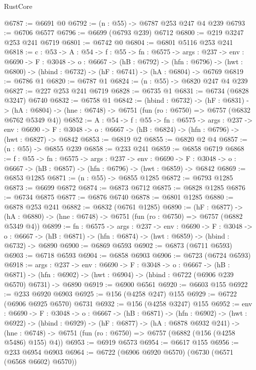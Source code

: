 \begin{lexlean}{RustCore}
\begin{coremodule}
@6787 := @6691 @0
@6792 := (n : @55) -> @6787 @253 @247 @4 @239
@6793 := @6706 @6577
@6796 := @6699 (@6793 @239) @6712
@6800 := @219 @3247 @253 @241 @6719
@6801 := @6742 @0
@6804 := @6801 @5116 @253 @241
@6818 := {c : @53} ->
  {A : @54} ->
  {f : @55} ->
  {fn : @6575} ->
  {args : @237} ->
  {env : @6690} ->
  {F : @3048} ->
  {o : @6667} ->
  (hB : @6792) ->
  (hfn : @6796) -> (hwt : @6800) -> (hbind : @6732) -> (hF : @6741) -> (hA : @6804) -> @6769
@6819 := @6786 @1
@6820 := @6787 @1
@6824 := (n : @55) -> @6820 @247 @4 @239
@6827 := @227 @253 @241 @6719
@6828 := @6735 @1
@6831 := @6734 (@6828 @3247) @6740
@6832 := @6758 @1
@6842 := (hbind : @6732) ->
  (hF : @6831) ->
  (hA : @6804) -> (hne : @6748) -> @6751 (fun (ro : @6750) => @6757 (@6832 @6762 @5349 @4))
@6852 := {A : @54} ->
  {f : @55} ->
  {fn : @6575} ->
  {args : @237} ->
  {env : @6690} ->
  {F : @3048} -> {o : @6667} -> (hB : @6824) -> (hfn : @6796) -> (hwt : @6827) -> @6842
@6853 := @6819 @2
@6855 := @6820 @2 @4
@6857 := (n : @55) -> @6855 @239
@6858 := @233 @241
@6859 := @6858 @6719
@6868 := {f : @55} ->
  {fn : @6575} ->
  {args : @237} ->
  {env : @6690} ->
  {F : @3048} -> {o : @6667} -> (hB : @6857) -> (hfn : @6796) -> (hwt : @6859) -> @6842
@6869 := @6853 @1285
@6871 := (n : @55) -> @6855 @1285
@6872 := @6793 @1285
@6873 := @6699 @6872
@6874 := @6873 @6712
@6875 := @6828 @1285
@6876 := @6734 @6875
@6877 := @6876 @6740
@6878 := @6801 @1285
@6880 := @6878 @253 @241
@6882 := @6832 (@6761 @1285)
@6890 := (hF : @6877) ->
  (hA : @6880) -> (hne : @6748) -> @6751 (fun (ro : @6750) => @6757 (@6882 @5349 @4))
@6899 := {fn : @6575} ->
  {args : @237} ->
  {env : @6690} ->
  {F : @3048} ->
  {o : @6667} -> (hB : @6871) -> (hfn : @6874) -> (hwt : @6859) -> (hbind : @6732) -> @6890
@6900 := @6869 @6593
@6902 := @6873 (@6711 @6593)
@6903 := @6718 @6593
@6904 := @6858 @6903
@6906 := @6723 (@6724 @6593)
@6918 := {args : @237} ->
  {env : @6690} ->
  {F : @3048} ->
  {o : @6667} ->
  (hB : @6871) ->
  (hfn : @6902) -> (hwt : @6904) -> (hbind : @6722 (@6906 @239 @6570) @6731) -> @6890
@6919 := @6900 @6561
@6920 := @6603 @155
@6922 := @233 @6920 @6903
@6925 := @156 (@4258 @247) @155
@6929 := @6722 (@6906 @6925 @6570) @6731
@6932 := @156 (@4258 @3247) @155
@6952 := {env : @6690} ->
  {F : @3048} ->
  {o : @6667} ->
  (hB : @6871) ->
  (hfn : @6902) ->
  (hwt : @6922) ->
  (hbind : @6929) ->
  (hF : @6877) ->
  (hA : @6878 @6932 @241) ->
  (hne : @6748) -> @6751 (fun (ro : @6750) => @6757 (@6882 (@156 (@4258 @5486) @155) @4))
@6953 := @6919 @6573
@6954 := @6617 @155
@6956 := @233 @6954 @6903
@6964 := @6722 (@6906 @6920 @6570) (@6730 (@6571 (@6568 @6602) @6570))

\end{coremodule}
\end{lexlean}
